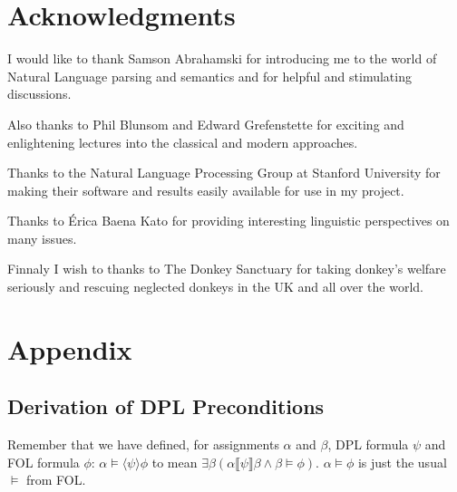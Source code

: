 \documentclass[12pt]{article}
\let\stdsection\section
\renewcommand\section{\newpage\stdsection}
\begin{document}
\section{Acknowledgments}
I would like to thank Samson Abrahamski for introducing me to the world of Natural Language parsing and semantics and for helpful and stimulating discussions.

Also thanks to Phil Blunsom and Edward Grefenstette for exciting and enlightening lectures into the classical and modern approaches.

Thanks to the Natural Language Processing Group at Stanford University for making their software and results easily available for use in my project\cite{klein2003accurate}.

Thanks to Érica Baena Kato for providing interesting linguistic perspectives on many issues.

Finnaly I wish to thanks to The Donkey Sanctuary\cite{donkey2013sanctuary} for taking donkey's welfare seriously and rescuing neglected donkeys in the UK and all over the world.

\newpage
\section{Appendix}

\subsection{Derivation of DPL Preconditions}
Remember that we have defined, for assignments $\alpha$ and $\beta$, DPL formula $\psi$ and FOL formula $\phi$: $\alpha\models\langle\psi\rangle\phi$ to mean $\exists\beta(\alpha\llbracket\psi\rrbracket\beta\wedge\beta\models\phi)$. $\alpha\models\phi$ is just the usual $\models$ from FOL.
\end{document}
